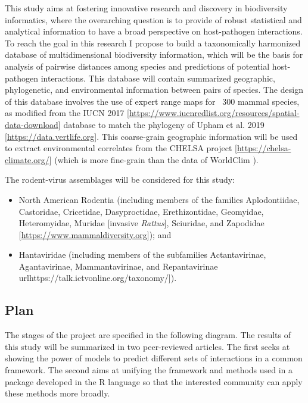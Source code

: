 \documentclass{article}
\begin{document}
This study aims at fostering innovative research and discovery in biodiversity informatics, where the overarching question is to provide of robust statistical and analytical information to have a broad perspective on host-pathogen interactions. To reach the goal in this research I propose to build a taxonomically harmonized database of multidimensional biodiversity information, which will be the basis for analysis of pairwise distances among species and predictions of potential host-pathogen interactions. This database will contain summarized geographic, phylogenetic, and environmental information between pairs of species. The design of this database involves the use of expert range maps for ~300 mammal species, as modified from the IUCN 2017 [\url{https://www.iucnredlist.org/resources/spatial-data-download}] database to match the phylogeny of Upham et al. 2019 \cite{upham2019inferring} [\url{https://data.vertlife.org}]. This coarse-grain geographic information will be used to extract environmental correlates from the CHELSA project [\url{https://chelsa-climate.org/}] (which is more fine-grain than the data of WorldClim \cite{Karger2017chelsa}).

The rodent-virus assemblages will be considered for this study: 
\begin{itemize}
    \item North American Rodentia (including members of the families Aplodontiidae, Castoridae, Cricetidae, Dasyproctidae, Erethizontidae, Geomyidae, Heteromyidae, Muridae [invasive \textit{Rattus}], Sciuridae, and Zapodidae \cite{mammal_diversity_database_2022_5945626}[\url{https://www.mammaldiversity.org}]); and
    \item Hantaviridae (including members of the subfamilies Actantavirinae, Agantavirinae, Mammantavirinae, and Repantavirinae \cite{lefkowitz2018virus}
    \\url{https://talk.ictvonline.org/taxonomy/}]).
\end{itemize}

\subsection*{Plan}
The stages of the project are specified in the following diagram. The results of this study will be summarized in two peer-reviewed articles. The first seeks at showing the power of models to predict different sets of interactions in a common framework. The second aims at unifying the framework and methods used in a package developed in the R language so that the interested community can apply these methods more broadly.
\end{document}
